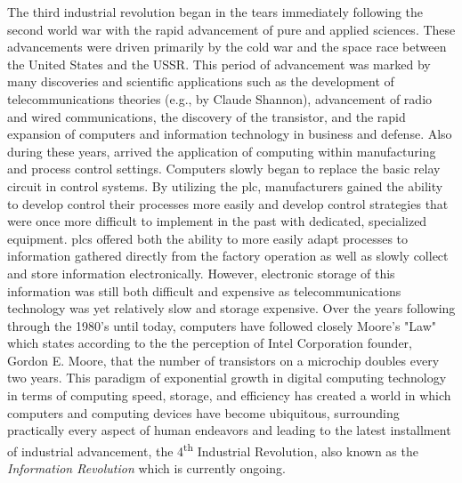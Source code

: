 The third industrial revolution began in the tears immediately following the second world war with the rapid advancement of pure and applied sciences.  These advancements were driven primarily by the cold war and the space race between the United States and the USSR.  This period of advancement was marked by many discoveries and scientific applications such as the development of telecommunications theories (e.g., by Claude Shannon), advancement of radio and wired communications, the discovery of the transistor, and the rapid expansion of computers and information technology in business and defense.  Also during these years, arrived the application of computing within manufacturing and process control settings. Computers slowly began to replace the basic relay circuit in control systems.  By utilizing the \gls{plc}, manufacturers gained the ability to develop control their processes more easily and develop control strategies that were once more difficult to implement in the past with dedicated, specialized equipment.  \Glspl{plc} offered both the ability to more easily adapt processes to information gathered directly from the factory operation as well as slowly collect and store information electronically.  However, electronic storage of this information was still both difficult and expensive as telecommunications technology was yet relatively slow and storage expensive.  Over the years following through the 1980's until today, computers have followed closely Moore's "Law" which states according to the the perception of Intel Corporation founder, Gordon E. Moore, that the number of transistors on a microchip doubles every two years.  This paradigm of exponential growth in digital computing technology in terms of computing speed, storage, and efficiency has created a world in which computers and computing devices have become ubiquitous, surrounding practically every aspect of human endeavors and leading to the latest installment of industrial advancement, the 4\textsuperscript{th} Industrial Revolution, also known as the \textit{Information Revolution} which is currently ongoing. 

